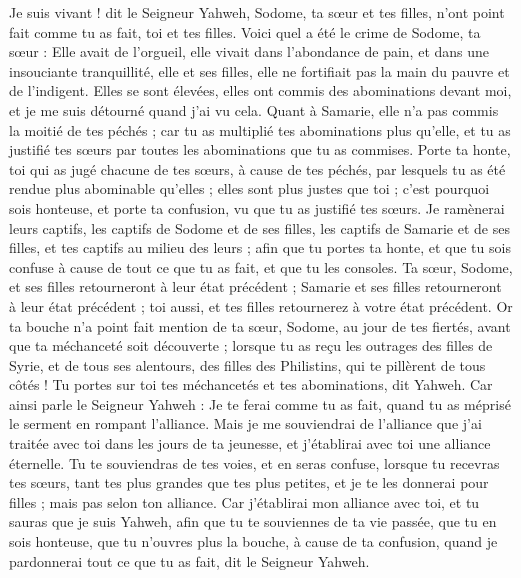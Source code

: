 \begin{multicols}{2}
Je suis vivant ! dit le Seigneur Yahweh,  Sodome, ta sœur et tes filles, n'ont point fait comme tu as fait, toi et tes filles.
Voici quel a été le crime de Sodome, ta sœur : Elle avait de l'orgueil, elle vivait dans l'abondance de pain, et dans une insouciante tranquillité, elle et ses filles, elle ne fortifiait pas la main du pauvre et de l’indigent.
Elles se sont élevées, elles ont commis des abominations devant moi, et je me suis détourné quand j’ai vu cela.
Quant à Samarie, elle n'a pas commis la moitié de tes péchés ; car tu as multiplié tes abominations plus qu'elle, et tu as justifié tes sœurs par toutes les abominations que tu as commises.
Porte ta honte, toi qui as jugé chacune de tes sœurs, à cause de tes péchés, par lesquels tu as été rendue plus abominable qu'elles ; elles sont plus justes que toi ; c'est pourquoi sois honteuse, et porte ta confusion, vu que tu as justifié tes sœurs.
Je ramènerai leurs captifs, les captifs de Sodome et de ses filles, les captifs de Samarie et de ses filles, et tes captifs au milieu des leurs ;
afin que tu portes ta honte, et que tu sois confuse à cause de tout ce que tu as fait, et que tu les consoles.
Ta sœur, Sodome, et ses filles retourneront à leur état précédent ; Samarie et ses filles retourneront à leur état précédent ; toi aussi, et tes filles retournerez à votre état précédent.
Or ta bouche n'a point fait mention de ta sœur, Sodome, au jour de tes fiertés,
avant que ta méchanceté soit découverte ; lorsque tu as reçu les outrages des filles de Syrie, et de tous ses alentours, des filles des Philistins, qui te pillèrent de tous côtés !
Tu portes sur toi tes méchancetés  et tes abominations, dit Yahweh.
Car ainsi parle le Seigneur Yahweh : Je te ferai comme tu as fait, quand tu as méprisé le serment en rompant l’alliance.
Mais je me souviendrai de l'alliance que j'ai traitée avec toi dans les jours de ta jeunesse, et j'établirai avec toi une alliance éternelle.
Tu te souviendras de tes voies, et en seras confuse, lorsque tu recevras tes sœurs, tant tes plus grandes que tes plus petites, et je te les donnerai pour filles ; mais pas selon ton alliance.
Car j'établirai mon alliance avec toi, et tu sauras que je suis Yahweh,
afin que tu te souviennes de ta vie passée, que tu en sois honteuse, que tu n'ouvres plus la bouche, à cause de ta confusion, quand je pardonnerai tout ce que tu as fait, dit le Seigneur Yahweh.

\end{multicols}
